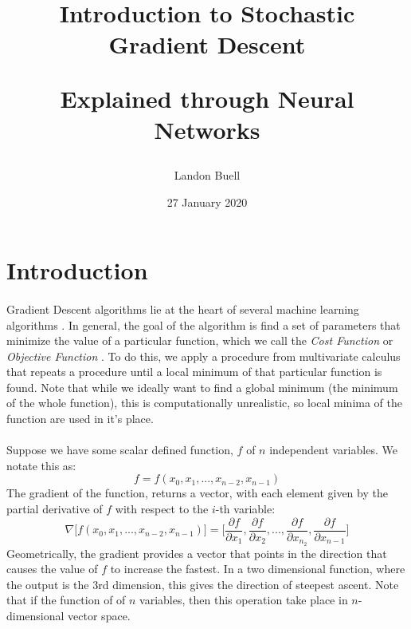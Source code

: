 \documentclass[12pt,letterpaper]{article}
\begin{document}

\title{
\begin{Huge}
Introduction to Stochastic Gradient Descent
\end{Huge} 
\Large Explained through Neural Networks}
\author{Landon Buell}
\date{27 January 2020}
\maketitle


\section{Introduction}
\paragraph*{}Gradient Descent algorithms lie at the heart of several machine learning algorithms \cite{Goodfellow}. In general, the goal of the algorithm is find a set of parameters that minimize the value of a particular function, which we call the \textit{Cost Function} or \textit{Objective Function} \cite{Gareth}. To do this, we apply a procedure from multivariate calculus that repeats a procedure until a local minimum of that particular function is found. Note that while we ideally want to find a global minimum (the minimum of the whole function), this is computationally unrealistic, so local minima of the function are used in it's place. 
\paragraph*{}Suppose we have some scalar defined function, $f$ of $n$ independent variables. We notate this as:
\begin{equation}
\label{f}
f = f(x_0,x_1,...,x_{n-2},x_{n-1})
\end{equation}
The gradient of the function, returns a vector, with each element given by the partial derivative of $f$ with respect to the $i$-th variable:
\begin{equation}
\label{grad f}
\nabla \big[ f(x_0,x_1,...,x_{n-2},x_{n-1}) \big] =
\Big[ \frac{\partial f}{\partial x_1} , \frac{\partial f}{\partial x_2} , ... ,
\frac{\partial f}{\partial x_{n_2}} , \frac{\partial f}{\partial x_{n-1}} \Big]
\end{equation}
Geometrically, the gradient provides a vector that points in the direction that causes the value of $f$ to increase the fastest. In a two dimensional function, where the output is the 3rd dimension, this gives the direction of steepest ascent. Note that if the function of of $n$ variables, then this operation take place in $n$-dimensional vector space.
\end{document}
